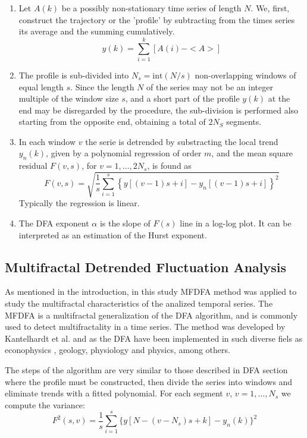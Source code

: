 \documentclass[onecolumn, preprint,aps,amsmath, amssymb, superscriptaddress]{revtex4}
\begin{document}
\begin{enumerate}
\item Let $A(k)$ be a possibly non-stationary time series of length $N$. We, first, construct the trajectory or the 'profile' by subtracting from the times series its average and the summing cumulatively.
\begin{equation}
y(k) = \sum_{i=1}^{k}[A(i)-<A>]
\label{profile}
\end{equation} 
\item The profile is sub-divided into $N_s=\text{int}(N/s)$ non-overlapping windows of equal length $s$. Since the length $N$ of the series may not be an integer multiple of the window size $s$, and a short part of the profile $y(k)$ at the end may be disregarded by the procedure, the sub-division is performed also starting from the opposite end, obtaining a total of $2N_S$ segments.

\item In each window $v$ the serie is detrended by substracting the local trend $y_n(k)$, given by a polynomial regression of order $m$,  and the mean square residual $F(v,s)$, for $v=1,\dots,2N_s$, is found as
\begin{equation}
F(v,s) = \sqrt{\dfrac{1}{s}\displaystyle\sum_{i=1}^{s}\left\lbrace y[(v-1)s+i]-y_n[(v-1)s+i]\right\rbrace^2}
\end{equation}
Typically the regression is linear.  
\item The DFA exponent $\alpha$ is the slope of $F(s)$ line in a log-log plot. It can be interpreted as an estimation of the Hurst exponent.
\end{enumerate}

\subsection{Multifractal Detrended Fluctuation Analysis}

As mentioned in the introduction, in this study MFDFA method was applied to study the multifractal characteristics of the analized temporal series. The MFDFA is a multifractal generalization of the DFA algorithm, and is commonly used to detect multifractality in a time series. The method was developed by Kantelhardt et al. \cite{Kantelhardt} and as the DFA have been implemented in such diverse fiels as econophysics \cite{Zunino,Caraiani}, geology\cite{Telesca}, physiology \cite{Peng_2, Nandan} and physics\cite{Santos}, among others. 

The steps of the algorithm are very similar to those described in DFA section where the profile must be constructed, then divide the series into windows and eliminate trends with a fitted polynomial. For each segment $v$, $v=1,\ldots,N_s$  we compute the variance:
\begin{equation}
 	F^2 (s,v)=\frac{1}{s} \sum_{i=1}^s\{y[N-(v-N_s )s+k]-y_n (k)\}^2
 	\label{eq:var2}
\end{equation}
\end{document}
